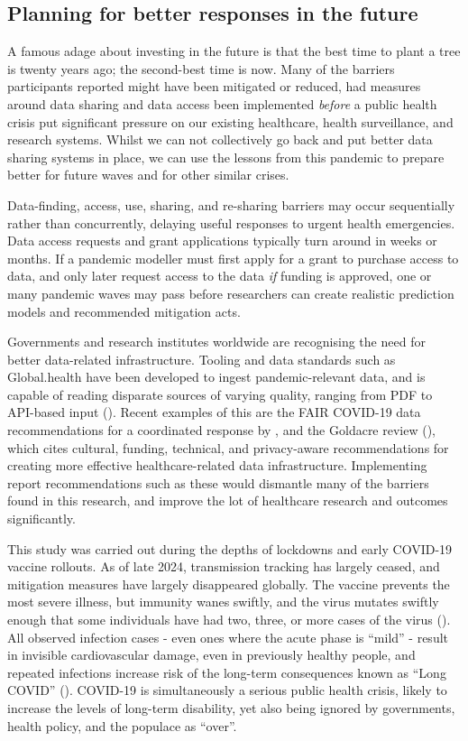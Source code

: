 \documentclass{CUP-JNL-DAP}%
\begin{document}
\subsection{Planning for better responses in the future}
A famous adage about investing in the future is that the best time to plant a tree is twenty years ago; the second-best time is now. Many of the barriers participants reported might have been mitigated or reduced, had measures around data sharing and data access been implemented \textit{before} a public health crisis put significant pressure on our existing healthcare, health surveillance, and research systems. Whilst we can not collectively go back and put better data sharing systems in place, we can use the lessons from this pandemic to prepare better for future waves and for other similar crises. 

Data-finding, access, use, sharing, and re-sharing barriers may occur sequentially rather than concurrently, delaying useful responses to urgent health emergencies. Data access requests and grant applications typically turn around in weeks or months. If a pandemic modeller must first apply for a grant to purchase access to data, and only later request access to the data \textit{if} funding is approved, one or many pandemic waves may pass before researchers can create realistic prediction models and recommended mitigation acts. 

Governments and research institutes worldwide are recognising the need for better data-related infrastructure. Tooling and data standards such as Global.health have been developed to ingest pandemic-relevant data, and is capable of reading disparate sources of varying quality, ranging from PDF to API-based input (\cite{kraemer_data_2021}). Recent examples of this are the FAIR COVID-19 data recommendations for a coordinated response by \cite{FAIR_data_for_a_coordinated_COVID-19_response}, and the Goldacre review (\cite{goldacre_review}), which cites cultural, funding, technical, and privacy-aware recommendations for creating more effective healthcare-related data infrastructure.  Implementing report recommendations such as these would dismantle many of the barriers found in this research, and improve the lot of healthcare research and outcomes significantly.

This study was carried out during the depths of lockdowns and early COVID-19 vaccine rollouts. As of late 2024, transmission tracking has largely ceased, and mitigation measures have largely disappeared globally. The vaccine prevents the most severe illness, but immunity wanes swiftly, and the virus mutates swiftly enough that some individuals have had two, three, or more cases of the virus (\cite{collaboratory_burden_2022}). All observed infection cases - even ones where the acute phase is “mild” - result in invisible cardiovascular damage, even in previously healthy people, and repeated infections increase risk of the long-term consequences known as “Long COVID” (\cite{davis_et_al}). COVID-19 is simultaneously a serious public health crisis, likely to increase the levels of long-term disability, yet also being ignored by governments, health policy, and the populace as “over”.
\end{document}
